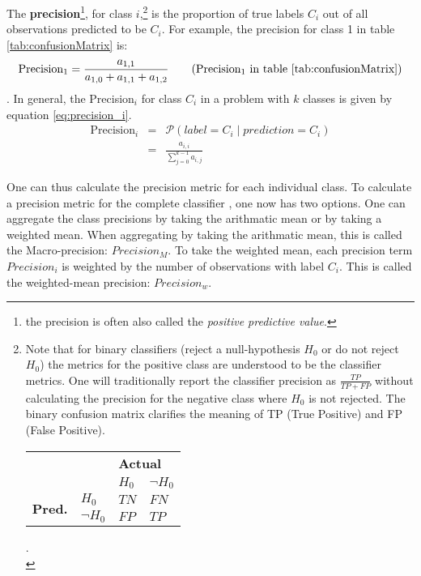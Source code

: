 The \textbf{precision}\footnote{the precision is often also called the \textit{positive predictive value}.}, for class $i$,\footnote{
    Note that for binary classifiers (reject a null-hypothesis $H_0$ or do not reject $H_0$) the metrics for the positive class are understood to be the classifier metrics. 
    One will traditionally report the classifier precision as $\frac{TP}{TP+FP}$ without calculating the precision for the negative class where $H_0$ is not rejected.
    The binary confusion matrix clarifies the meaning of TP (True Positive) and FP (False Positive).
    \begin{tabular}{clll}
        \multicolumn{1}{l}{}                &                        & \multicolumn{2}{l}{\textbf{Actual}}           \\
        \multicolumn{1}{l}{}                &                        & $H_0$   & $\neg H_0$                         \\ \cline{3-4} 
        \multirow{2}{*}{\textbf{Pred.}}   & \multicolumn{1}{l|}{$H_0$} & $TN$ & \multicolumn{1}{l|}{$FN$} \\
                                            & \multicolumn{1}{l|}{$\neg H_0$} & $FP$  & \multicolumn{1}{l|}{$TP$ } \\ \hline
        \end{tabular}.\\
} is the proportion of true labels $C_i$ out of all observations predicted to be $C_i$. 
For example, the precision for class 1 in table \ref{tab:confusionMatrix} is:
\begin{equation}
    \text{Precision}_1 = \frac{a_{1,1}}{a_{1,0} + a_{1,1} + a_{1, 2}} \tag{Precision$_1$ in table \ref{tab:confusionMatrix}}
\end{equation}.
In general, the Precision$_i$ for class $C_i$ in a problem with $k$ classes is given by equation \ref{eq:precision_i}.
\begin{eqnarray}
    \text{Precision}_i &=& \mathcal{P} \left( label = C_i \mid prediction = C_i \right) \\
    &=& \frac{a_{i, i}}{\sum_{j=0}^{k-1} a_{i, j}} \label{eq:precision_i}
\end{eqnarray}

One can thus calculate the precision metric for each individual class. 
To calculate a precision metric for the complete classifier
, one now has two options.
One can aggregate the class precisions by taking the arithmatic mean or by taking a weighted mean.
When aggregating by taking the arithmatic mean, this is called the Macro-precision: $Precision_M$.
To take the weighted mean, each precision term $Precision_i$ is weighted by the number of observations with label $C_i$. 
This is called the weighted-mean precision: $Precision_w$.

